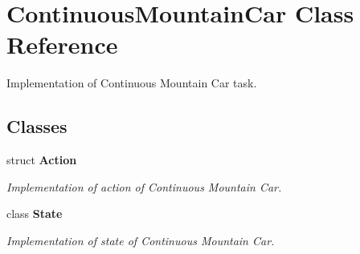 \section{Continuous\+Mountain\+Car Class Reference}
\label{classmlpack_1_1rl_1_1ContinuousMountainCar}


Implementation of Continuous Mountain Car task.  


\subsection*{Classes}
\begin{DoxyCompactItemize}
\item 
struct \textbf{ Action}
\begin{DoxyCompactList}\small\item\em Implementation of action of Continuous Mountain Car. \end{DoxyCompactList}\item 
class \textbf{ State}
\begin{DoxyCompactList}\small\item\em Implementation of state of Continuous Mountain Car. \end{DoxyCompactList}\end{DoxyCompactItemize}
